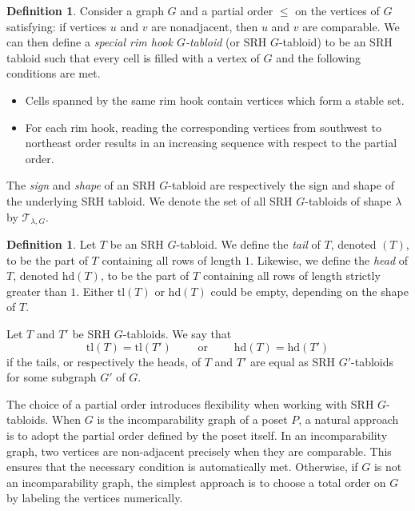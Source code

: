 \documentclass[12pt]{amsart}
\newcommand{\orr}{\qquad\text{ or }\qquad}
\numberwithin{equation}{section}
\theoremstyle{plain}
\theoremstyle{definition}
\newtheorem{definition}[equation]{Definition}
\theoremstyle{remark}
\begin{document}
 
 \begin{definition}
 \label{def:SRH_G_tabs}
 Consider a graph $G$ and a partial order $\le$ on the vertices of $G$ satisfying: if vertices $u$ and $v$ are nonadjacent, then $u$ and $v$ are comparable. We can then define a \textit{special rim hook $G$-tabloid} (or SRH $G$-tabloid) to be an SRH tabloid such that every cell is filled with a vertex of $G$ and the following conditions are met.
\begin{itemize}
    \item Cells spanned by the same rim hook contain vertices which form a stable set.
    \item For each rim hook, reading the corresponding vertices from southwest to northeast order results in an increasing sequence with respect to the partial order.
\end{itemize}
The \textit{sign} and \textit{shape} of an SRH $G$-tabloid are respectively the sign and shape of the underlying SRH tabloid.
We denote the set of all SRH $G$-tabloids of shape $\lambda$ by $\mathcal{T}_{\lambda,G}$.
 \end{definition}


\begin{definition}
\label{def:tail_head}
Let $T$ be an SRH $G$-tabloid. We define the \textit{tail} of $T$, denoted $(T)$, to be the part of $T$ containing all rows of length $1$. Likewise, we define the \textit{head} of $T$, denoted $\text{hd}(T)$, to be the part of $T$ containing all rows of length strictly greater than $1$. Either tl$(T)$ or hd$(T)$ could be empty, depending on the shape of $T$. 
\end{definition}

Let $T$ and $T'$ be SRH $G$-tabloids. We say that
\[
\text{tl}(T)=\text{tl}(T') \orr \text{hd}(T)=\text{hd}(T')
\]
if the tails, or respectively the heads, of $T$ and $T'$ are equal as SRH $G'$-tabloids for some subgraph $G'$ of $G$.



 The choice of a partial order introduces flexibility when working with SRH $G$-tabloids. When $G$ is the incomparability graph of a poset $P$, a natural approach is to adopt the partial order defined by the poset itself. In an incomparability graph, two vertices are non-adjacent precisely when they are comparable. This ensures that the necessary condition is automatically met. Otherwise, if $G$ is not an incomparability graph, the simplest approach is to choose a total order on $G$ by labeling the vertices numerically.
\end{document}

